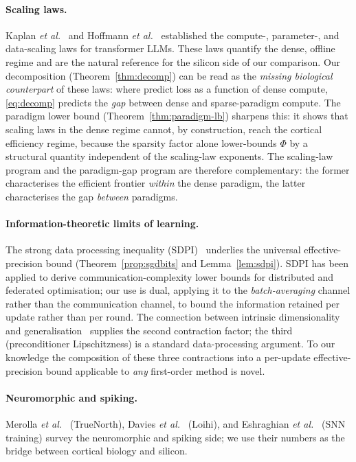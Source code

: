 \documentclass[11pt]{article}
\theoremstyle{definition}
\theoremstyle{remark}
\begin{document}
\paragraph{Scaling laws.}
Kaplan \emph{et al.}~\cite{kaplan2020scaling} and
Hoffmann \emph{et al.}~\cite{hoffmann2022chinchilla} established the
compute-, parameter-, and data-scaling laws for transformer LLMs.  These
laws quantify the dense, offline regime and are the natural reference
for the silicon side of our comparison.  Our decomposition
(Theorem~\ref{thm:decomp}) can be read as the \emph{missing
biological counterpart} of these laws: where
\cite{kaplan2020scaling,hoffmann2022chinchilla} predict loss as a
function of dense compute, \cref{eq:decomp} predicts the
\emph{gap} between dense and sparse-paradigm compute.  The paradigm
lower bound (Theorem~\ref{thm:paradigm-lb}) sharpens this: it shows
that scaling laws in the dense regime cannot, by construction,
reach the cortical efficiency regime, because the sparsity factor
alone lower-bounds $\Phi$ by a structural quantity independent of
the scaling-law exponents.  The scaling-law program and the
paradigm-gap program are therefore complementary: the former
characterises the efficient frontier \emph{within} the dense
paradigm, the latter characterises the gap \emph{between} paradigms.

\paragraph{Information-theoretic limits of learning.}
The strong data processing inequality
(SDPI)~\cite{raginsky2016strong} underlies the universal
effective-precision bound (Theorem~\ref{prop:sgdbits} and
Lemma~\ref{lem:sdpi}).  SDPI has been applied to derive
communication-complexity lower bounds for distributed and federated
optimisation; our use is dual, applying it to the
\emph{batch-averaging} channel rather than the communication channel,
to bound the information retained per update rather than per round.
The connection between intrinsic dimensionality and
generalisation~\cite{li2018measuring} supplies the second contraction
factor; the third (preconditioner Lipschitzness) is a standard
data-processing argument.  To our knowledge the composition of these
three contractions into a per-update effective-precision bound
applicable to \emph{any} first-order method is novel.

\paragraph{Neuromorphic and spiking.}
Merolla \emph{et al.}~\cite{merolla2014million} (TrueNorth),
Davies \emph{et al.}~\cite{davies2018loihi} (Loihi), and
Eshraghian \emph{et al.}~\cite{eshraghian2021training} (SNN training)
survey the neuromorphic and spiking side; we use their numbers as
the bridge between cortical biology and silicon.
\end{document}
